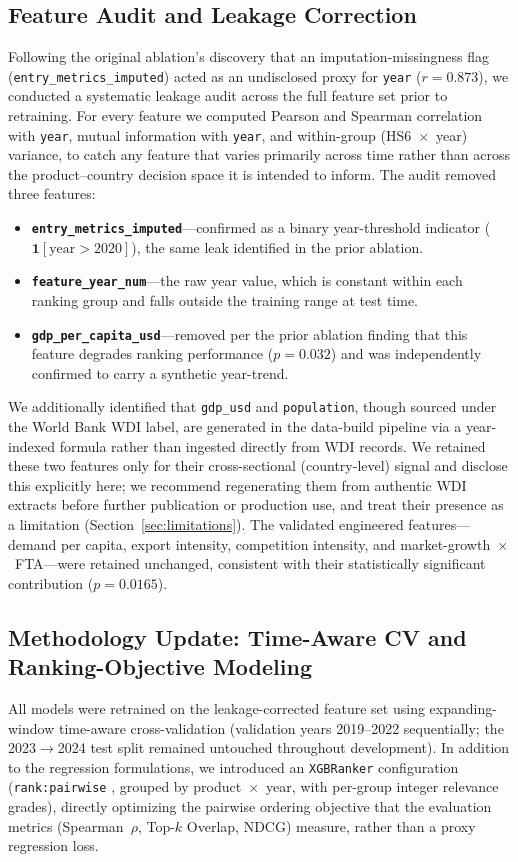\documentclass[conference]{IEEEtran}
\newcommand{\arrowto}{$\rightarrow$}
\begin{document}
\subsection{Feature Audit and Leakage Correction}
\label{sub:audit}
Following the original ablation's discovery that an imputation-missingness
flag (\texttt{entry\_metrics\_imputed}) acted as an undisclosed proxy for
\texttt{year} ($r=0.873$), we conducted a systematic leakage audit \cite{kaufman2012} across
the full feature set prior to retraining. For every feature we computed
Pearson and Spearman correlation with \texttt{year}, mutual information
with \texttt{year}, and within-group (HS6~$\times$~year) variance, to
catch any feature that varies primarily across time rather than across the
product--country decision space it is intended to inform. The audit
removed three features:
\begin{itemize}
\item \textbf{\texttt{entry\_metrics\_imputed}}---confirmed as a binary
year-threshold indicator ($\mathbf{1}[\text{year}>2020]$), the same leak
identified in the prior ablation.
\item \textbf{\texttt{feature\_year\_num}}---the raw year value, which is
constant within each ranking group and falls outside the training range at
test time.
\item \textbf{\texttt{gdp\_per\_capita\_usd}}---removed per the prior
ablation finding that this feature degrades ranking performance
($p=0.032$) and was independently confirmed to carry a synthetic
year-trend.
\end{itemize}
We additionally identified that \texttt{gdp\_usd} and \texttt{population},
though sourced under the World Bank WDI label, are generated in the
data-build pipeline via a year-indexed formula rather than ingested
directly from WDI records. We retained these two features only for their
cross-sectional (country-level) signal and disclose this explicitly here;
we recommend regenerating them from authentic WDI extracts before further
publication or production use, and treat their presence as a limitation
(Section~\ref{sec:limitations}). The validated engineered
features---demand per capita, export intensity, competition intensity, and
market-growth~$\times$~FTA---were retained unchanged, consistent with
their statistically significant contribution ($p=0.0165$).

\subsection{Methodology Update: Time-Aware CV and Ranking-Objective Modeling}
All models were retrained on the leakage-corrected feature set using
expanding-window time-aware cross-validation (validation years 2019--2022
sequentially; the 2023\arrowto 2024 test split remained untouched
throughout development). In addition to the regression formulations, we
introduced an \texttt{XGBRanker} configuration (\texttt{rank:pairwise}
\cite{burges2010},
grouped by product~$\times$~year, with per-group integer relevance grades),
directly optimizing the pairwise ordering objective that the evaluation
metrics (Spearman~$\rho$, Top-$k$ Overlap, NDCG) measure, rather than a
proxy regression loss.
\end{document}
